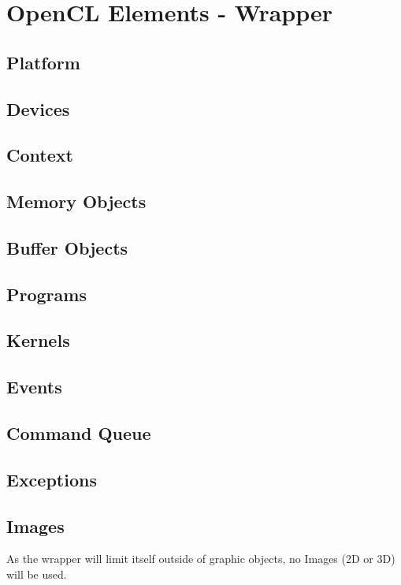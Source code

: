 \documentclass[a4paper]{article}
\begin{document}
\newpage
\section{OpenCL Elements - Wrapper}
\subsection{Platform}
\subsection{Devices}
\subsection{Context}
\subsection{Memory Objects}
\subsection{Buffer Objects}
\subsection{Programs}
\subsection{Kernels}
\subsection{Events}
\subsection{Command Queue}
\subsection{Exceptions}
\subsection{Images}
As the wrapper will limit itself outside of graphic objects, no Images (2D or 3D) will be used.

\newpage
\end{document}
